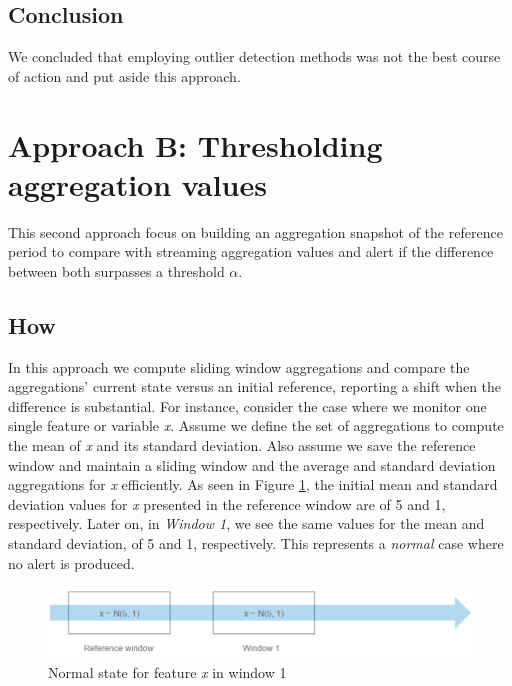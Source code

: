 \subsection*{Conclusion}
We concluded that employing outlier detection methods was not the best course of action and put aside this approach.

\section{Approach B: Thresholding aggregation values}
This second approach focus on building an aggregation snapshot of the reference period to compare with streaming aggregation values and alert if the difference between both surpasses a threshold $\alpha$.

\subsection*{How}

In this approach we compute sliding window aggregations and compare the aggregations’ current state versus an initial reference, reporting a shift when the difference is substantial. For instance, consider the case where we monitor one single feature or variable \textit{x}. Assume we define the set of aggregations to compute the mean of \textit{x} and its standard deviation. Also assume we save the reference window and maintain a sliding window and the average and standard deviation aggregations for \textit{x} efficiently. As seen in Figure \ref{fig:approach2-initial-state}, the initial mean and standard deviation values for \textit{x} presented in the reference window are of 5 and 1, respectively. Later on, in \textit{Window 1}, we see the same values for the mean and standard deviation, of 5 and 1, respectively. This represents a \textit{normal} case where no alert is produced.

\begin{figure}[!htb]
    \begin{center}
      \includegraphics[scale=0.65]{figures/approach2-normality.png}
      \caption[]{Normal state for feature \textit{x} in window 1}
      \label{fig:approach2-initial-state}
    \end{center}
\end{figure}


